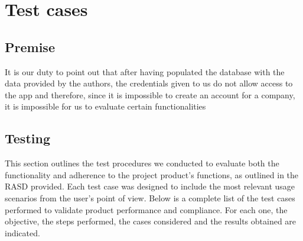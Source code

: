\chapter{Test cases}
\section{Premise}
It is our duty to point out that after having populated the database with the data provided by the authors,
the credentials given to us do not allow access to the app and therefore,
since it is impossible to create an account for a company, it is impossible for us to evaluate certain functionalities
\section{Testing}
This section outlines the test procedures we conducted to evaluate both the functionality and adherence to the project product's functions, as outlined in the RASD provided.
Each test case was designed to include the most relevant usage scenarios from the user's point of view.
Below is a complete list of the test cases performed to validate product performance and compliance.
For each one, the objective, the steps performed, the cases considered and the results obtained are indicated.

